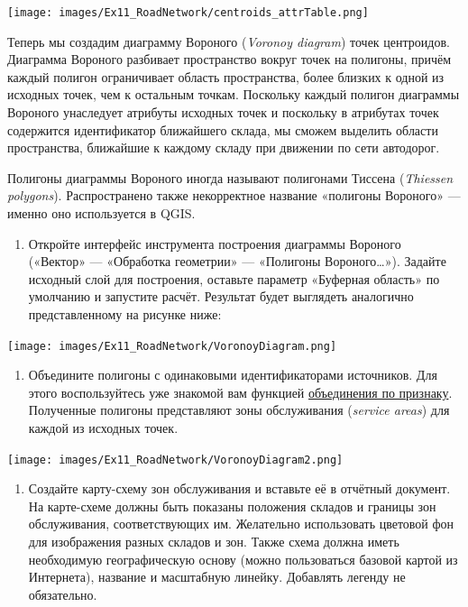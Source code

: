 \documentclass[
  12pt,
]{book}
\providecommand{\tightlist}{%
  \setlength{\itemsep}{0pt}\setlength{\parskip}{0pt}}
\begin{document}
\texttt{[image: images/Ex11\_RoadNetwork/centroids\_attrTable.png]}

Теперь мы создадим диаграмму Вороного (\emph{Voronoy diagram}) точек центроидов. Диаграмма Вороного разбивает пространство вокруг точек на полигоны, причём каждый полигон ограничивает область пространства, более близких к одной из исходных точек, чем к остальным точкам. Поскольку каждый полигон диаграммы Вороного унаследует атрибуты исходных точек и поскольку в атрибутах точек содержится идентификатор ближайшего склада, мы сможем выделить области пространства, ближайшие к каждому складу при движении по сети автодорог.

Полигоны диаграммы Вороного иногда называют полигонами Тиссена (\emph{Thiessen polygons}). Распространено также некорректное название «полигоны Вороного» --- именно оно используется в QGIS.

\begin{enumerate}
\def\labelenumi{\arabic{enumi}.}
\setcounter{enumi}{10}
\tightlist
\item
  Откройте интерфейс инструмента построения диаграммы Вороного («Вектор» --- «Обработка геометрии» --- «Полигоны Вороного\ldots»). Задайте исходный слой для построения, оставьте параметр «Буферная область» по умолчанию и запустите расчёт. Результат будет выглядеть аналогично представленному на рисунке ниже:
\end{enumerate}

\texttt{[image: images/Ex11\_RoadNetwork/VoronoyDiagram.png]}

\begin{enumerate}
\def\labelenumi{\arabic{enumi}.}
\setcounter{enumi}{11}
\tightlist
\item
  Объедините полигоны с одинаковыми идентификаторами источников. Для этого воспользуйтесь уже знакомой вам функцией \protect\hyperlink{overlay-merge}{объединения по признаку}. Полученные полигоны представляют зоны обслуживания (\emph{service areas}) для каждой из исходных точек.
\end{enumerate}

\texttt{[image: images/Ex11\_RoadNetwork/VoronoyDiagram2.png]}

\begin{enumerate}
\def\labelenumi{\arabic{enumi}.}
\setcounter{enumi}{12}
\tightlist
\item
  Создайте карту-схему зон обслуживания и вставьте её в отчётный документ. На карте-схеме должны быть показаны положения складов и границы зон обслуживания, соответствующих им. Желательно использовать цветовой фон для изображения разных складов и зон. Также схема должна иметь необходимую географическую основу (можно пользоваться базовой картой из Интернета), название и масштабную линейку. Добавлять легенду не обязательно.
\end{enumerate}
\end{document}
